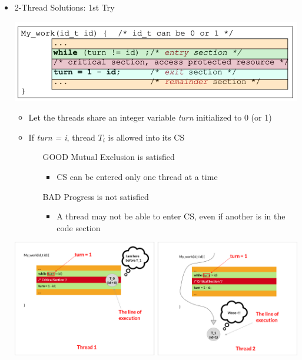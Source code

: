 \documentclass[12pt]{article}
\begin{document}
\begin{itemize}
    \item 2-Thread Solutions: 1st Try

    \begin{center}
    \includegraphics[width=0.8\linewidth]{images/week_2_notes_2_10.png}
    \end{center}

    \begin{itemize}


        \item Let the threads share an integer variable \textit{turn}
        initialized to 0 (or 1)
        \item If \textit{turn = i}, thread $T_i$ is allowed into its CS

        \bigskip

        \begin{itemize}
            \item [GOOD] Mutual Exclusion is satisfied
            \begin{itemize}
                \item CS can be entered only one thread at a time
            \end{itemize}
            \item [BAD] Progress is not satisfied
            \begin{itemize}
                \item A thread may not be able to enter CS, even if another is in
                the code section
            \end{itemize}
        \end{itemize}
    \end{itemize}

    \begin{center}
    \includegraphics[width=\linewidth]{images/week_2_notes_2_11.png}
    \end{center}


\end{itemize}
\end{document}
